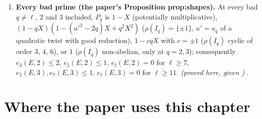 \begin{enumerate}[label=\textbf{\thechapter.\arabic*}]
valuations differ by $e_\ell(E,p)$. \emph{(proved here)} .
\item \textbf{Every bad prime (the paper's Proposition prop:shapes).} At every bad $q\ne\ell$, $2$ and $3$ included, $P_q$ is $1-X$ (potentially multiplicative),
$(1-qX)(1-(a'^2-2q)X+q^2X^2)$ ($\rho(I_q)=\{\pm1\}$, $a'=a_q$ of a quadratic twist with good reduction), $1-cqX$ with $c=\pm1$ ($\rho(I_q)$ cyclic of order $3$, $4$, $6$), or
$1$ ($\rho(I_q)$ non-abelian, only at $q=2,3$); consequently $e_3(E,2)\le2$, $e_5(E,2)\le1$, $e_\ell(E,2)=0$ for $\ell\ge7$, $e_5(E,3),e_7(E,3)\le1$,
$e_\ell(E,3)=0$ for $\ell\ge11$. \emph{(proved here, given )} .
\end{enumerate}

\section*{Where the paper uses this chapter}

